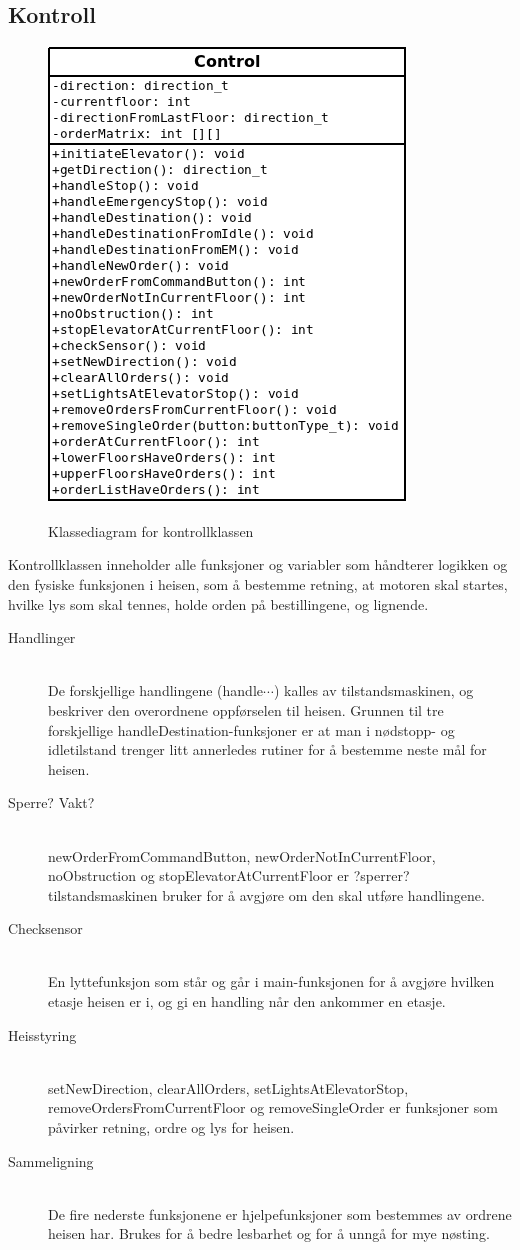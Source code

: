 \subsection{Kontroll}
\begin{figure}
\centering
\includegraphics[scale=0.6]{control.png}
\label{klasse:kontroll}
\caption{Klassediagram for kontrollklassen}
\end{figure}
Kontrollklassen inneholder alle funksjoner og variabler som håndterer logikken og den fysiske funksjonen i heisen, som å bestemme retning, at motoren skal startes, hvilke lys som skal tennes, holde orden på bestillingene, og lignende.
\begin{description}
\item[Handlinger]\hfill \\
De forskjellige handlingene (handle$\cdots$) kalles av tilstandsmaskinen, og beskriver den overordnene oppførselen til heisen. Grunnen til tre forskjellige handleDestination-funksjoner er at man i nødstopp- og idletilstand trenger litt annerledes rutiner for å bestemme neste mål for heisen.
\item[Sperre? Vakt?]\hfill \\
newOrderFromCommandButton, newOrderNotInCurrentFloor, noObstruction og stopElevatorAtCurrentFloor er ?sperrer? tilstandsmaskinen bruker for å avgjøre om den skal utføre handlingene.
\item[Checksensor]\hfill \\
En lyttefunksjon som står og går i main-funksjonen for å avgjøre hvilken etasje heisen er i, og gi en handling når den ankommer en etasje.
\item[Heisstyring]\hfill \\
setNewDirection, clearAllOrders, setLightsAtElevatorStop, removeOrdersFromCurrentFloor og removeSingleOrder er funksjoner som påvirker retning, ordre og lys for heisen.
\item[Sammeligning]\hfill \\ 
De fire nederste funksjonene er hjelpefunksjoner som bestemmes av ordrene heisen har. Brukes for å bedre lesbarhet og for å unngå for mye nøsting.
\end{description}
